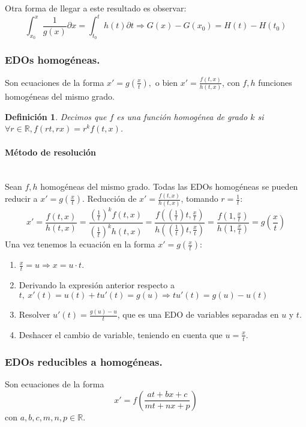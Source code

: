 \documentclass{article}
\theoremstyle{theorem-style}  %
\theoremstyle{definition-style}
\newtheorem{definition}{Definición}[section]
\theoremstyle{example-style}
\begin{document}
Otra forma de llegar a este resultado es observar:
\[ \int_{x_0}^{x} \frac{1}{g(x)} \partial x= \int_{t_0}^{t} h(t) \partial t \Rightarrow G(x)-G(x_0)=H(t)-H(t_0)\]
\subsubsection{EDOs homogéneas.}
Son ecuaciones de la forma $ x'=g(\frac{x}{t}), $ o bien $ x'=\frac{f(t,x)}{h(t,x)} $, con $ f,h $ funciones homogéneas del mismo grado.
\begin{definition}
	Decimos que $ f $ es una \emph{función homogénea de grado $ k $} si $ \forall r \in \mathbb{R}, f(rt,rx)=r^kf(t,x)$.
\end{definition}
\paragraph{Método de resolución} \ \\
Sean $ f,h $ homogéneas del mismo grado. Todas las EDOs homogéneas se pueden reducir a $ x'=g(\frac{x}{t})$.
Reducción de  $ x'=\frac{f(t,x)}{h(t,x)} $, tomando $ r=\frac{1}{t} $:
	\[ x'= \frac{f(t,x)}{h(t,x)}=\frac{(\frac{1}{t})^kf(t,x)}{(\frac{1}{t})^kh(t,x)}=\frac{f((\frac{1}{t})t,\frac{x}{t})}{h((\frac{1}{t})t,\frac{x}{t})}=\frac{f(1,\frac{x}{t})}{h(1,\frac{x}{t})}=g(\frac{x}{t})\]
	Una vez tenemos la ecuación en la forma $ x'=g(\frac{x}{t}) $:
	\begin{enumerate}
		\item $ \frac{x}{t}=u\Rightarrow x=u\cdot t $.
		\item Derivando la expresión anterior respecto a $t,\  x'(t)=u(t)+tu'(t)=g(u) \Rightarrow tu'(t)=g(u)-u(t) $
		\item Resolver $ u'(t)=\frac{g(u)-u}{t} $, que es una EDO de variables separadas en $ u $ y $ t $.
		\item Deshacer el cambio de variable, teniendo en cuenta que $ u=\frac{x}{t} $.
	\end{enumerate}

\subsubsection{EDOs reducibles a homogéneas.}
Son ecuaciones de la forma \[ x'=f(\frac{at+bx+c}{mt+nx+p}) \]con $ a,b,c,m,n,p \in \mathbb{R} $.
\end{document}
